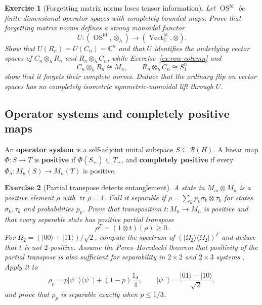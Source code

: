 \documentclass{article}
\newtheorem{exercise}{Exercise}
\newcommand{\trace}{\operatorname{tr}}
\begin{document}
\begin{exercise}[Forgetting matrix norms loses tensor information]
\leavevmode\par
\textit{Let $\operatorname{OS}^{\mathrm{fd}}$ be finite-dimensional operator
spaces with completely bounded maps. Prove that forgetting matrix norms
defines a strong monoidal functor}
\[
U:(\operatorname{OS}^{\mathrm{fd}},\otimes_h)
\longrightarrow
(\operatorname{Vect}_{\mathbb C}^{\mathrm{fd}},\otimes).
\]
\textit{Show that $U(R_n)=U(C_n)=\mathbb C^n$ and that $U$ identifies the
underlying vector spaces of $C_n\otimes_hR_n$ and $R_n\otimes_hC_n$, while
Exercise~\ref{ex:row-column} and}
\[
C_n\otimes_hR_n\cong M_n,
\qquad
R_n\otimes_hC_n\cong S_1^n
\]
\textit{show that it forgets their complete norms. Deduce that the ordinary
flip on vector spaces has no completely isometric symmetric-monoidal lift
through $U$.}\par
\end{exercise}

\subsection{Operator systems and completely positive maps}

An \textbf{operator system} is a self-adjoint unital subspace
$S\subseteq\mathcal B(H)$. A linear map $\Phi:S\to T$ is \textbf{positive}
if $\Phi(S_+)\subseteq T_+$, and \textbf{completely positive} if every
$\Phi_n:M_n(S)\to M_n(T)$ is positive.

\begin{exercise}[Partial transpose detects entanglement]
\leavevmode\par
\textit{A state in $M_m\otimes M_n$ is a positive element $\rho$ with
$\trace\rho=1$. Call it separable if
$\rho=\sum_k p_k\sigma_k\otimes\tau_k$ for states $\sigma_k,\tau_k$ and
probabilities $p_k$. Prove that transposition $t:M_n\to M_n$ is positive and
that every separable state has positive partial transpose}
\cite{peres-ppt}
\[
\rho^\Gamma=(1\otimes t)(\rho)\geq0.
\]
\textit{For
$\Omega_2=(|00\rangle+|11\rangle)/\sqrt2$, compute the spectrum of
$(|\Omega_2\rangle\langle\Omega_2|)^\Gamma$ and deduce that $t$ is not
$2$-positive. Assume the Peres--Horodecki theorem that positivity of the
partial transpose is also sufficient for separability in
$2\times2$ and $2\times3$ systems \cite{horodecki-ppt}. Apply it to}
\[
\rho_p=p|\psi^-\rangle\langle\psi^-|+(1-p)\frac{1_4}{4},
\qquad
|\psi^-\rangle=\frac{|01\rangle-|10\rangle}{\sqrt2},
\]
\textit{and prove that $\rho_p$ is separable exactly when $p\leq1/3$.}
\end{exercise}
\end{document}
